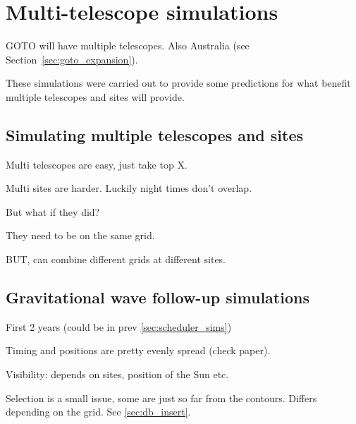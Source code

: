 \section{Multi-telescope simulations}
\label{sec:multitel_sims}
\begin{colsection}


\begin{colsection}

GOTO will have multiple telescopes. Also Australia (see Section~\ref{sec:goto_expansion}).

These simulations were carried out to provide some predictions for what benefit multiple telescopes and sites will provide.


\end{colsection}


\subsection{Simulating multiple telescopes and sites}
\label{sec:multi_site}
\begin{colsection}

Multi telescopes are easy, just take top X.

Multi sites are harder. Luckily night times don't overlap.

But what if they did?

They need to be on the same grid.

BUT, can combine different grids at different sites.

\end{colsection}


\subsection{Gravitational wave follow-up simulations}
\label{sec:gw_sims}
\begin{colsection}

First 2 years (could be in prev \autoref{sec:scheduler_sims})

Timing and positions are pretty evenly spread (check paper).

Visibility: depends on sites, position of the Sun etc.

Selection is a small issue, some are just so far from the contours. Differs depending on the grid. See \autoref{sec:db_insert}.


\end{colsection}
\end{colsection}
